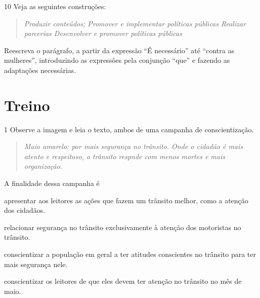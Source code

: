 \num{10} Veja as seguintes construções:

\begin{quote}
\emph{Produzir conteúdos; Promover e implementar políticas públicas
Realizar parcerias Desenvolver e promover políticas públicas}
\end{quote}

Reescreva o parágrafo, a partir da expressão ``É necessário'' até
``contra as mulheres'', introduzindo as expressões pela conjunção
``que'' e fazendo as adaptações necessárias.


\section{Treino}

\num{1} Observe a imagem e leia o texto, ambos de uma campanha de
conscientização.


\begin{quote}
\emph{Maio amarelo: por mais segurança no trânsito. Onde o
cidadão é mais atento e respeitoso, o trânsito respnde com menos mortes
e mais organização.}
\end{quote}

A finalidade dessa campanha é

\begin{escolha}
\item apresentar aos leitores as ações que fazem um trânsito melhor, como
a atenção dos cidadãos.

\item relacionar segurança no trânsito exclusivamente à atenção dos
motoristas no trânsito.

\item conscientizar a população em geral a ter atitudes conscientes no
trânsito para ter mais segurança nele.

\item conscientizar os leitores de que eles devem ter atenção no trânsito
no mês de maio.
\end{escolha}


